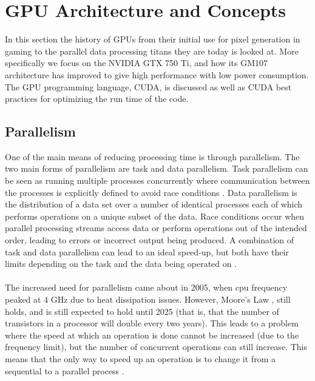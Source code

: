 \section{GPU Architecture and Concepts}\label{gpu}
In this section the history of GPUs from their initial use for pixel generation in gaming to the parallel data processing titans they are today is looked at. More specifically we focus on the NVIDIA GTX 750 Ti, and how its GM107 architecture has improved to give high performance with low power consumption. The GPU programming language, CUDA, is discussed as well as CUDA best practices for optimizing the run time of the code.
\subsection{Parallelism}\label{gpu:sec:par}
One of the main means of reducing processing time is through parallelism. The two main forms of parallelism are task and data parallelism. Task parallelism can be seen as running multiple processes concurrently where communication between the processes is explicitly defined to avoid race conditions \citep{subhlok1993exploiting}. Data parallelism is the distribution of a data set over a number of identical processes each of which performs operations on a unique subset of the data. Race conditions occur when parallel processing streams access data or perform operations out of the intended order, leading to errors or incorrect output being produced. A combination of task and data parallelism can lead to an ideal speed-up, but both have their limits depending on the task and the data being operated on \citep{subhlok1993exploiting}.
\\
\\
The increased need for parallelism came about in 2005, when \gls{cpu} frequency peaked at 4 GHz due to heat dissipation issues. However, Moore's Law \citep{moore2006cramming}, still holds, and is still expected to hold until 2025 (that is, that the number of transistors in a processor will double every two years). This leads to a problem where the speed at which an operation is done cannot be increased (due to the frequency limit), but the number of concurrent operations can still increase. This means that the only way to speed up an operation is to change it from a sequential to a parallel process \citep{rajan2013informatics}.
